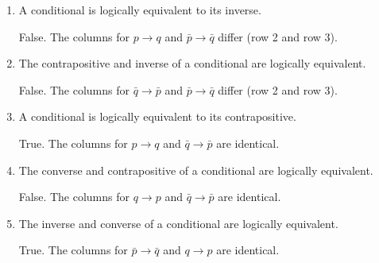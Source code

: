 \begin{enumerate}
\begin{enumerate}
    \item A conditional is logically equivalent to its inverse.\\
    \begin{subanswer}
      False. The columns for $p \rightarrow q$ and $\bar{p} \rightarrow \bar{q}$ differ (row 2 and row 3).
    \end{subanswer}

    \item The contrapositive and inverse of a conditional are logically equivalent.\\
    \begin{subanswer}
      False. The columns for $\bar{q} \rightarrow \bar{p}$ and $\bar{p} \rightarrow \bar{q}$ differ (row 2 and row 3).
    \end{subanswer}

    \item A conditional is logically equivalent to its contrapositive.\\
    \begin{subanswer}
      True. The columns for $p \rightarrow q$ and $\bar{q} \rightarrow \bar{p}$ are identical.
    \end{subanswer}

    \item The converse and contrapositive of a conditional are logically equivalent.\\
    \begin{subanswer}
      False. The columns for $q \rightarrow p$ and $\bar{q} \rightarrow \bar{p}$ are identical.
    \end{subanswer}

    \item The inverse and converse of a conditional are logically equivalent.\\
    \begin{subanswer}
      True. The columns for $\bar{p} \rightarrow \bar{q}$ and $q \rightarrow p$ are identical.
    \end{subanswer}
  \end{enumerate}



  \newpage


\end{enumerate}

